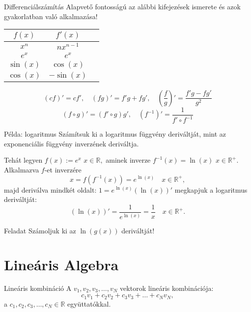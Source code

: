 \documentclass[10pt]{beamer}
\newcommand{\R}[0]{\mathbb{R}}
\begin{document}
\begin{frame}[t]{Differenciálszámítás}
Alapvető fontosságú az alábbi kifejezések ismerete és azok gyakorlatban való alkalmazása!
\begin{table}
\centering
\begin{tabular}{ccc}
\toprule
$f(x)$ & $f'(x)$ \\
\midrule
$x^n$ & $n x^{n-1}$\\
$e^x$ & $e^x$\\
$\sin(x)$ & $\cos(x)$\\
$\cos(x)$ & $-\sin(x)$
\end{tabular}
\end{table}

\[(cf)' = cf', \quad (fg)' = f'g + fg', \quad \left(\frac{f}{g}\right)' = \frac{f'g - fg'}{g^2}\]
\[(f\circ g)' = (f'\circ g) g', \quad \left(f^{-1}\right)' = \frac{1}{f'\circ f^{-1}}\]
\end{frame}

\begin{frame}[t]{Példa: logaritmus}
Számítsuk ki a logaritmus függvény deriváltját, mint az exponenciális függvény inverzének deriváltja.

Tehát legyen $f(x):=e^x$ $x\in\R,$ aminek inverze $f^{-1}(x) = \ln(x)$ $x\in\R^+.$
Alkalmazva $f$-et inverzére
\[x = f(f^{-1}(x)) = e^{\ln(x)} \quad x\in\R^+,\]
majd deriválva mindkét oldalt: $1 = e^{\ln(x)} (\ln(x))'$ megkapjuk
a logaritmus deriváltját:
\[(\ln(x))' = \frac{1}{e^{\ln(x)}} = \frac{1}{x}  \quad x\in\R^+.\]
\begin{exampleblock}{Feladat}
Számoljuk ki az $\ln(g(x))$ deriváltját!
\end{exampleblock}
\end{frame}



\section{Lineáris Algebra}
\begin{frame}[t]{Lineáris kombináció}
A $v_1, v_2, v_3, \dots,v_N$ vektorok lineáris kombinációja:
\[c_1 v_1 + c_2 v_2 + c_3 v_3 + \dots + c_N v_N,\]
a $c_1, c_2, c_3,\dots, c_N\in\R$ együttatókkal.

\end{frame}
\end{document}
